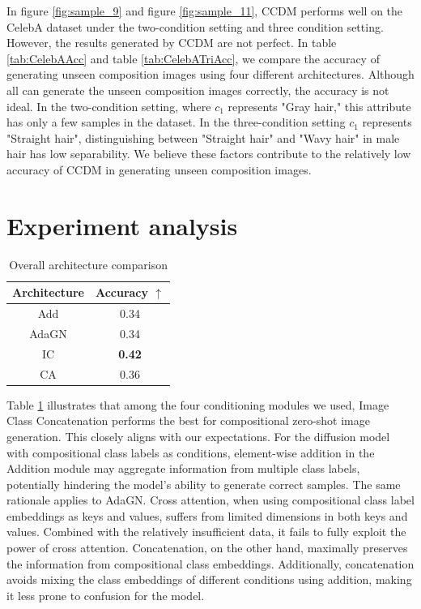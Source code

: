 In figure \ref{fig:sample_9} and figure \ref{fig:sample_11}, CCDM performs well on the CelebA dataset under the two-condition setting and three condition setting. However, the results generated by CCDM are not perfect. In table \ref{tab:CelebAAcc} and table \ref{tab:CelebATriAcc}, we compare the accuracy of generating unseen composition images using four different architectures. Although all can generate the unseen composition images correctly, the accuracy is not ideal. In the two-condition setting, where $c_1$ represents "Gray hair," this attribute has only a few samples in the dataset. In the three-condition setting $c_1$ represents "Straight hair", distinguishing between "Straight hair" and "Wavy hair" in male hair has low separability. We believe these factors contribute to the relatively low accuracy of CCDM in generating unseen composition images.

\section{Experiment analysis}
\begin{table} [H]
    \centering
    \begin{tabular}{cc}
         Architecture & Accuracy $\uparrow$\\
         \hline
         Add & 0.34\\
         AdaGN & 0.34\\
         IC & \textbf{0.42}\\
         CA & 0.36\\
    \end{tabular}
    \caption{Overall architecture comparison}
    \label{tab:OverallAcc}
\end{table}

Table \ref{tab:OverallAcc}  illustrates that among the four conditioning modules we used, Image Class Concatenation performs the best for compositional zero-shot image generation. This closely aligns with our expectations. For the diffusion model with compositional class labels as conditions, element-wise addition in the Addition module may aggregate information from multiple class labels, potentially hindering the model's ability to generate correct samples. The same rationale applies to AdaGN. Cross attention, when using compositional class label embeddings as keys and values, suffers from limited dimensions in both keys and values. Combined with the relatively insufficient data, it fails to fully exploit the power of cross attention. Concatenation, on the other hand, maximally preserves the information from compositional class embeddings. Additionally, concatenation avoids mixing the class embeddings of different conditions using addition, making it less prone to confusion for the model.


